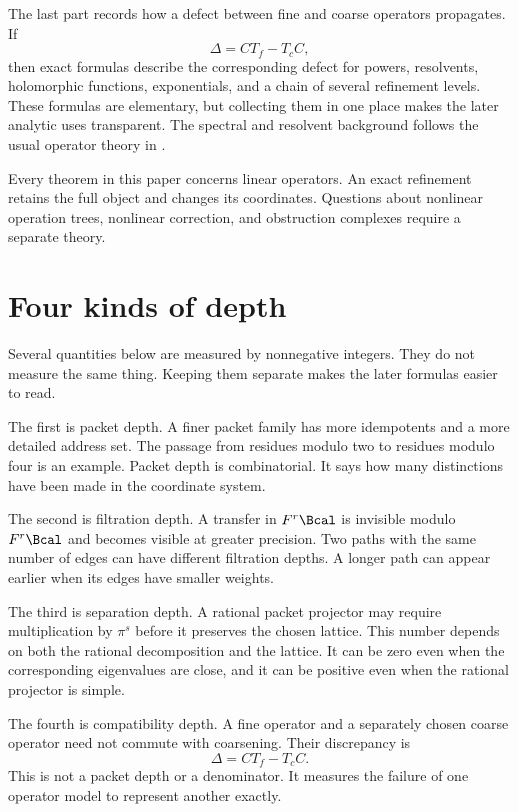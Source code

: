 The last part records how a defect between fine and coarse operators propagates.  If
\[
\Delta=CT_f-T_cC,
\]
then exact formulas describe the corresponding defect for powers, resolvents, holomorphic functions, exponentials, and a chain of several refinement levels.  These formulas are elementary, but collecting them in one place makes the later analytic uses transparent.  The spectral and resolvent background follows the usual operator theory in \cite{Kato1995}.

Every theorem in this paper concerns linear operators. An exact refinement retains the full object and changes its coordinates. Questions about nonlinear operation trees, nonlinear correction, and obstruction complexes require a separate theory.

\section{Four kinds of depth}\label{sec:four_depths}

Several quantities below are measured by nonnegative integers.  They do not measure the same thing.  Keeping them separate makes the later formulas easier to read.

The first is packet depth.  A finer packet family has more idempotents and a more detailed address set.  The passage from residues modulo two to residues modulo four is an example.  Packet depth is combinatorial.  It says how many distinctions have been made in the coordinate system.

The second is filtration depth.  A transfer in $F^r\Bcal$ is invisible modulo $F^r\Bcal$ and becomes visible at greater precision.  Two paths with the same number of edges can have different filtration depths.  A longer path can appear earlier when its edges have smaller weights.

The third is separation depth.  A rational packet projector may require multiplication by $\pi^s$ before it preserves the chosen lattice.  This number depends on both the rational decomposition and the lattice.  It can be zero even when the corresponding eigenvalues are close, and it can be positive even when the rational projector is simple.

The fourth is compatibility depth.  A fine operator and a separately chosen coarse operator need not commute with coarsening.  Their discrepancy is
\[
\Delta=CT_f-T_cC.
\]
This is not a packet depth or a denominator.  It measures the failure of one operator model to represent another exactly.

